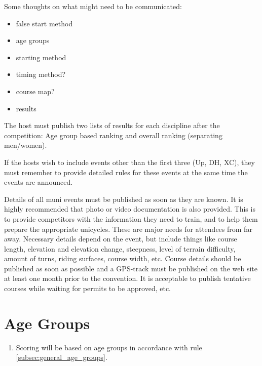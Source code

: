 \begin{comment2016}
Some thoughts on what might need to be communicated:
\begin{itemize}
\item false start method
\item age groups
\item starting method
\item timing method?
\item course map?
\item results
\end{itemize}
\end{comment2016}

The host must publish two lists of results for each discipline after the competition: Age group based ranking and overall ranking (separating men/women).

If the hosts wish to include events other than the first three (Up, DH, XC), they must remember to provide detailed rules for these events at the same time the events are announced.

Details of all muni events must be published as soon as they are known.
It is highly recommended that photo or video documentation is also provided.
This is to provide competitors with the information they need to train, and to help them prepare the appropriate unicycles.
These are major needs for attendees from far away.
Necessary details depend on the event, but include things like course length, elevation and elevation change, steepness, level of terrain difficulty, amount of turns, riding surfaces, course width, etc.
Course details should be published as soon as possible and a GPS-track must be published on the web site at least one month prior to the convention.
It is acceptable to publish tentative courses while waiting for permits to be approved, etc.

\section{Age Groups}

\begin{enumerate}[leftmargin=1.5em,labelsep=*]
	\item Scoring will be based on age groups in accordance with rule \ref{subsec:general_age_groups}.
\end{enumerate}

